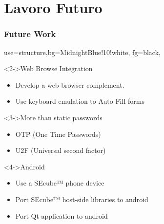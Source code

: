 \documentclass[14pt,usenames,dvipsnames]{beamer}
\begin{document}
\section{Lavoro Futuro}
\begin{frame}
	\frametitle{Future Work}
	{
	 {use=structure,bg=MidnightBlue!10!white, fg=black,}
  \fontsize{14pt}{14}\selectfont

	
  \vspace{-0.3cm}	
	  
	\begin{block}<2->{Web Browse Integration}
		\begin{itemize}
		  \item Develop a web browser complement.
			\item Use keyboard emulation to Auto Fill forms
		\end{itemize}
	\end{block}

	\vspace{-0.1cm}	

	\begin{block}<3->{More than static passwords}
		\begin{itemize}
			\item OTP (One Time Passwords)
			\item U2F (Universal second factor)
		\end{itemize}
	\end{block}
	
	\vspace{-0.1cm}	
	
	\begin{block}<4->{Android}
		\begin{itemize}
			\item Use a SEcube™ phone device
			\item Port SEcube™ host-side libraries to android
			\item Port Qt application to android
		\end{itemize}
	\end{block}	
	}
	
\end{frame}


\appendix
\end{document}
